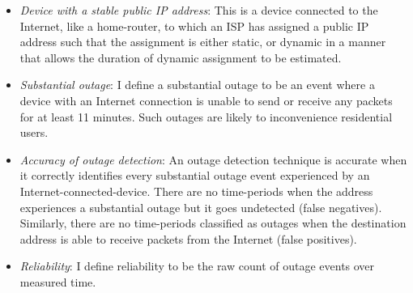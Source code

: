 \begin{itemize}

\item {\emph{Device with a stable public IP address}: This is a device
    connected to the Internet, like a
home-router, to which an ISP has assigned a public IP address such
that the
assignment is either static, or dynamic in a manner that allows the
duration of dynamic assignment to be estimated.}

\item {\emph{Substantial outage}: I define a substantial outage to be an event where a device
    with an Internet connection is unable to send or receive any
    packets for at least 11 minutes. Such outages are likely to inconvenience residential users.}

\item {\emph{Accuracy of outage detection}: An outage detection technique is accurate when it
correctly identifies every substantial outage event experienced by an Internet-connected-device. There are no time-periods when the address
experiences a substantial outage but it goes undetected (false
negatives). Similarly, there are no time-periods classified as
outages when the destination address is able to receive packets from the
Internet (false positives).}

\item {\emph{Reliability}: I define reliability to be the raw count of outage
events over measured time.}

\end{itemize}







